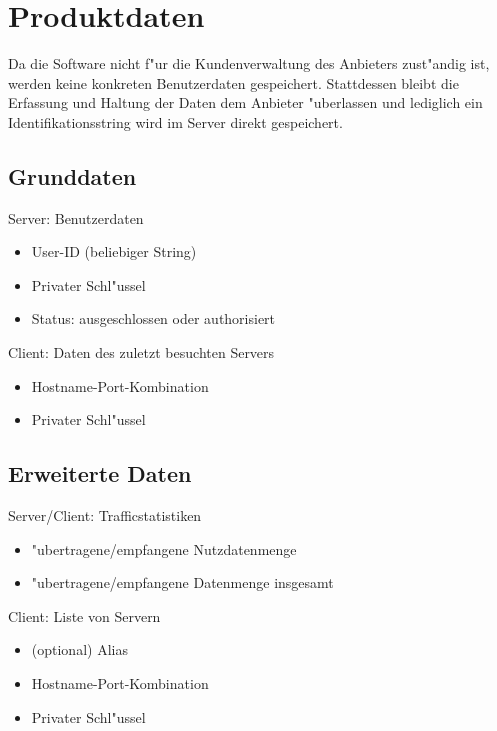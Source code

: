 \documentclass[a4paper,10pt]{scrartcl}
\begin{document}
\section{Produktdaten}
Da die Software nicht f"ur die Kundenverwaltung des Anbieters zust"andig ist, werden keine
konkreten Benutzerdaten gespeichert. Stattdessen bleibt die Erfassung und Haltung der Daten
dem Anbieter "uberlassen und lediglich ein Identifikationsstring wird im Server direkt gespeichert.

\subsection{Grunddaten}
\begin{usecase}
 {Server: Benutzerdaten
   \begin{itemize}
   \item User-ID (beliebiger String)
   \item Privater Schl"ussel
   \item Status: ausgeschlossen oder authorisiert
   \end{itemize}
}
 {Client: Daten des zuletzt besuchten Servers
   \begin{itemize}
   \item Hostname-Port-Kombination
   \item Privater Schl"ussel
   \end{itemize}
}
\end{usecase}

\subsection{Erweiterte Daten}
\begin{usecase}
 {Server/Client: Trafficstatistiken
   \begin{itemize}
   \item "ubertragene/empfangene Nutzdatenmenge
   \item "ubertragene/empfangene Datenmenge insgesamt
   \end{itemize}
}
 {Client: Liste von Servern
   \begin{itemize}
   \item (optional) Alias
   \item Hostname-Port-Kombination
   \item Privater Schl"ussel
   \end{itemize}
}
\end{usecase}
\end{document}
